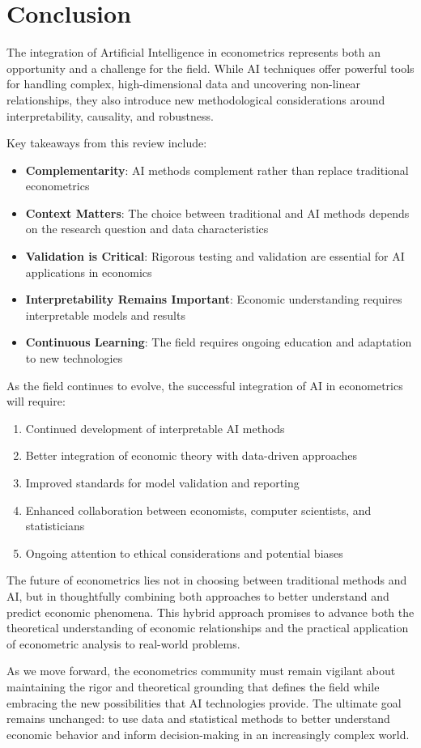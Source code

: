 \documentclass[12pt,a4paper]{article}
\begin{document}
\section{Conclusion}

The integration of Artificial Intelligence in econometrics represents both an opportunity and a challenge for the field. While AI techniques offer powerful tools for handling complex, high-dimensional data and uncovering non-linear relationships, they also introduce new methodological considerations around interpretability, causality, and robustness.

Key takeaways from this review include:

\begin{itemize}
    \item \textbf{Complementarity}: AI methods complement rather than replace traditional econometrics
    \item \textbf{Context Matters}: The choice between traditional and AI methods depends on the research question and data characteristics
    \item \textbf{Validation is Critical}: Rigorous testing and validation are essential for AI applications in economics
    \item \textbf{Interpretability Remains Important}: Economic understanding requires interpretable models and results
    \item \textbf{Continuous Learning}: The field requires ongoing education and adaptation to new technologies
\end{itemize}

As the field continues to evolve, the successful integration of AI in econometrics will require:

\begin{enumerate}
    \item Continued development of interpretable AI methods
    \item Better integration of economic theory with data-driven approaches
    \item Improved standards for model validation and reporting
    \item Enhanced collaboration between economists, computer scientists, and statisticians
    \item Ongoing attention to ethical considerations and potential biases
\end{enumerate}

The future of econometrics lies not in choosing between traditional methods and AI, but in thoughtfully combining both approaches to better understand and predict economic phenomena. This hybrid approach promises to advance both the theoretical understanding of economic relationships and the practical application of econometric analysis to real-world problems.

As we move forward, the econometrics community must remain vigilant about maintaining the rigor and theoretical grounding that defines the field while embracing the new possibilities that AI technologies provide. The ultimate goal remains unchanged: to use data and statistical methods to better understand economic behavior and inform decision-making in an increasingly complex world.
\end{document}

